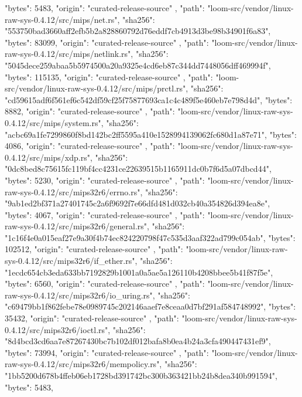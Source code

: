 {{      "bytes": 5483,
      "origin": "curated-release-source"
    },
    {
      "path": "loom-src/vendor/linux-raw-sys-0.4.12/src/mips/net.rs",
      "sha256": "553750bad3660aff2efb5b2a828860792d76eddf7cb4913d3be98b34901f6a83",
      "bytes": 83099,
      "origin": "curated-release-source"
    },
    {
      "path": "loom-src/vendor/linux-raw-sys-0.4.12/src/mips/netlink.rs",
      "sha256": "5045dece259abaa5b5974500a20a9325e4cd6eb87c344dd7448056dff469994f",
      "bytes": 115135,
      "origin": "curated-release-source"
    },
    {
      "path": "loom-src/vendor/linux-raw-sys-0.4.12/src/mips/prctl.rs",
      "sha256": "cd59615adf6f561ef6c542df59cf25f75877693ca1c4c489f5e460eb7e798d4d",
      "bytes": 8882,
      "origin": "curated-release-source"
    },
    {
      "path": "loom-src/vendor/linux-raw-sys-0.4.12/src/mips/system.rs",
      "sha256": "acbc69a1fe7299860f8bd142bc2ff5595a410e1528994139062fc680d1a87e71",
      "bytes": 4086,
      "origin": "curated-release-source"
    },
    {
      "path": "loom-src/vendor/linux-raw-sys-0.4.12/src/mips/xdp.rs",
      "sha256": "0dc8bed8c75615fc119bf4cc4231ce22639515b1165911dc0b7f6d5a07dbcd44",
      "bytes": 5230,
      "origin": "curated-release-source"
    },
    {
      "path": "loom-src/vendor/linux-raw-sys-0.4.12/src/mips32r6/errno.rs",
      "sha256": "9ab1ed2bf371a27401745c2a6f9692f7e66dfd481d032cb40a354826d394ea8e",
      "bytes": 4067,
      "origin": "curated-release-source"
    },
    {
      "path": "loom-src/vendor/linux-raw-sys-0.4.12/src/mips32r6/general.rs",
      "sha256": "1c16f4e0a015eaf27e9a30f4b74ec824220798f47c535d3aaf322ad799c054ab",
      "bytes": 102512,
      "origin": "curated-release-source"
    },
    {
      "path": "loom-src/vendor/linux-raw-sys-0.4.12/src/mips32r6/if_ether.rs",
      "sha256": "1ecdc654cb3eda633bb7192829b1001a0a5ae5a126110b4208bbee5b41f87f5e",
      "bytes": 6560,
      "origin": "curated-release-source"
    },
    {
      "path": "loom-src/vendor/linux-raw-sys-0.4.12/src/mips32r6/io_uring.rs",
      "sha256": "c69479bb1f862febe78e0989745c202146aaef7e8ceaa0d7bf291af584748992",
      "bytes": 35432,
      "origin": "curated-release-source"
    },
    {
      "path": "loom-src/vendor/linux-raw-sys-0.4.12/src/mips32r6/ioctl.rs",
      "sha256": "8d4bcd3cd6aa7e87267430bc7b102df012bafa8b0ea4b24a3cfa490447431ef9",
      "bytes": 73994,
      "origin": "curated-release-source"
    },
    {
      "path": "loom-src/vendor/linux-raw-sys-0.4.12/src/mips32r6/mempolicy.rs",
      "sha256": "1bb5200d678b4ffeb06eb1728bd391742bc300b363421bb24b8dea340b991594",
      "bytes": 5483,
}}

